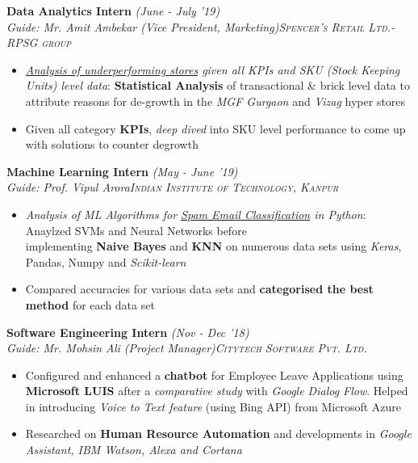 \documentclass{article}
\begin{document}
\vspace{-3pt}
\textbf{Data Analytics Intern} \hfill{\sl \small (June - July '19)}\\
{\it Guide: Mr. Amit Ambekar (Vice President, Marketing)}\hfill{\sl \small \textsc{Spencer's Retail Ltd.- RPSG group}}\\
\vspace{-18pt}
\begin{itemize}[itemsep = -1 mm, leftmargin=*]
    \item {\it \underline {Analysis of underperforming stores} given all KPIs and SKU (Stock Keeping Units) level data}: {\bf Statistical Analysis} of transactional \& brick level data to attribute reasons for de-growth in the {\it MGF Gurgaon} and {\it Vizag} hyper stores
     \item Given all category {\bf KPIs}, {\it deep dived} into SKU level performance to come up with solutions to counter degrowth
\end{itemize}
\hspace*{-15pt}\textbf{Machine Learning Intern} \hfill{\sl \small (May - June '19)}\\
{\it Guide: Prof. Vipul Arora}\hfill{\sl \small \textsc{Indian Institute of Technology, Kanpur}}\\
\vspace{-19pt}
\begin{itemize}[itemsep = -1 mm, leftmargin=*]
    \item {\it Analysis of ML Algorithms for \underline{Spam Email Classification} in Python}: Anaylzed SVMs and Neural Networks before\\implementing {\bf Naive Bayes} and {\bf KNN} on numerous data sets using {\it Keras}, Pandas, Numpy and {\it Scikit-learn}
      \item Compared accuracies for various data sets and {\bf categorised the best method} for each data set
\end{itemize}
\vspace{-5pt}
\textbf{Software Engineering Intern} \hfill{\sl \small (Nov - Dec '18)}\\
{\it Guide: Mr. Mohsin Ali (Project Manager)}\hfill{\sl \small \textsc{Citytech Software Pvt. Ltd.}}\\
\vspace{-19pt}
\begin{itemize}[itemsep = -1 mm, leftmargin=*]
  \item Configured and enhanced a {\bf chatbot} for Employee Leave Applications using {\bf Microsoft LUIS} after a {\sl comparative study} with {\it Google Dialog Flow}. Helped in introducing \textsl{Voice to Text feature} (using Bing API) from Microsoft Azure
  \item Researched on {\bf Human Resource Automation} and developments in \textit{Google Assistant, IBM Watson, Alexa and Cortana}
\end{itemize}
\end{document}
